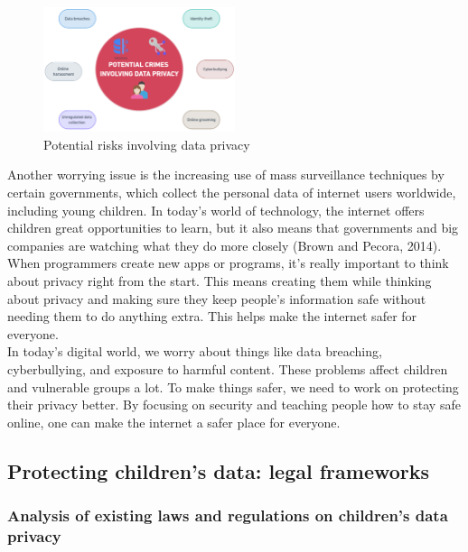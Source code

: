 \documentclass[a4paper, 10 pt, conference]{ieeeconf}  %
\begin{document}
\begin{figure}[h]
    \centering
    \includegraphics[width=0.5\textwidth]{1.png}
    \caption{Potential risks involving data privacy}
    \label{fig:example}
\end{figure}
Another worrying issue is the increasing use of mass surveillance techniques by certain governments, which collect the personal data of internet users worldwide, including young children. In today's world of technology, the internet offers children great opportunities to learn, but it also means that governments and big companies are watching what they do more closely (Brown and Pecora, 2014). When programmers create new apps or programs, it’s really important to think about privacy right from the start. This means creating them while thinking about privacy and making sure they keep people’s information safe without needing them to do anything extra. This helps make the internet safer for everyone.
\\ In today’s digital world, we worry about things like data breaching, cyberbullying, and exposure to harmful content. These problems affect children and vulnerable groups a lot. To make things safer, we need to work on protecting their privacy better. By focusing on security and teaching people how to stay safe online, one can make the internet a safer place for everyone.



\subsection{Protecting children’s data: legal frameworks}
\subsubsection{Analysis of existing laws and regulations on children’s data privacy}
\end{document}
